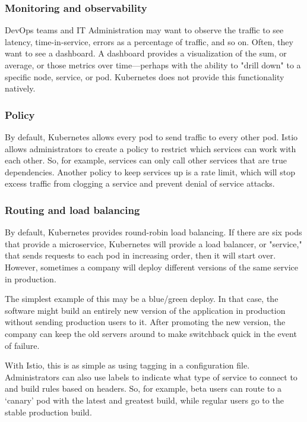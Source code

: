 \documentclass[conference]{IEEEtran}
\begin{document}
\subsubsection{Monitoring and observability}
DevOps teams and IT Administration may want to observe the traffic to see latency, time-in-service, errors as a percentage of traffic, and so on. Often, they want to see a dashboard. A dashboard provides a visualization of the sum, or average, or those metrics over time—perhaps with the ability to "drill down" to a specific node, service, or pod. Kubernetes does not provide this functionality natively.\cite{IBM}

\subsubsection{Policy}
By default, Kubernetes allows every pod to send traffic to every other pod. Istio allows administrators to create a policy to restrict which services can work with each other. So, for example, services can only call other services that are true dependencies. Another policy to keep services up is a rate limit, which will stop excess traffic from clogging a service and prevent denial of service attacks.\cite{IBM}

\subsubsection{Routing and load balancing}
By default, Kubernetes provides round-robin load balancing. If there are six pods that provide a microservice, Kubernetes will provide a load balancer, or "service," that sends requests to each pod in increasing order, then it will start over. However, sometimes a company will deploy different versions of the same service in production.

The simplest example of this may be a blue/green deploy. In that case, the software might build an entirely new version of the application in production without sending production users to it. After promoting the new version, the company can keep the old servers around to make switchback quick in the event of failure.

With Istio, this is as simple as using tagging in a configuration file. Administrators can also use labels to indicate what type of service to connect to and build rules based on headers. So, for example, beta users can route to a ‘canary’ pod with the latest and greatest build, while regular users go to the stable production build.\cite{IBM}
\end{document}
